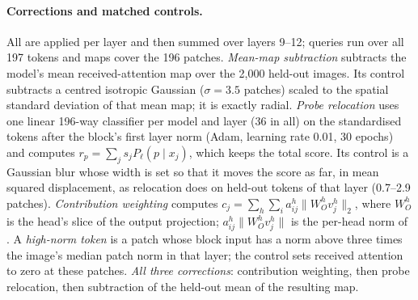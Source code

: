 \paragraph{Corrections and matched controls.} All are applied per layer and then summed over layers 9--12; queries run over all 197 tokens and maps cover the 196 patches.
\emph{Mean-map subtraction} subtracts the model's mean received-attention map over the 2,000 held-out images. Its control subtracts a centred isotropic Gaussian ($\sigma=3.5$ patches) scaled to the spatial standard deviation of that mean map; it is exactly radial.
\emph{Probe relocation} uses one linear 196-way classifier per model and layer (36 in all) on the standardised tokens after the block's first layer norm (Adam, learning rate 0.01, 30 epochs) and computes $r_p=\sum_j s_j P_\ell(p\mid x_j)$, which keeps the total score. Its control is a Gaussian blur whose width is set so that it moves the score as far, in mean squared displacement, as relocation does on held-out tokens of that layer (0.7--2.9 patches).
\emph{Contribution weighting} computes $c_j=\sum_h\sum_i a_{ij}^h\lVert W_O^h v_j^h\rVert_2$, where $W_O^h$ is the head's slice of the output projection; $a_{ij}^h\lVert W_O^h v_j^h\rVert$ is the per-head norm of \citet{kobayashi2020}. A \emph{high-norm token} is a patch whose block input has a norm above three times the image's median patch norm in that layer; the control sets received attention to zero at these patches.
\emph{All three corrections}: contribution weighting, then probe relocation, then subtraction of the held-out mean of the resulting map.

